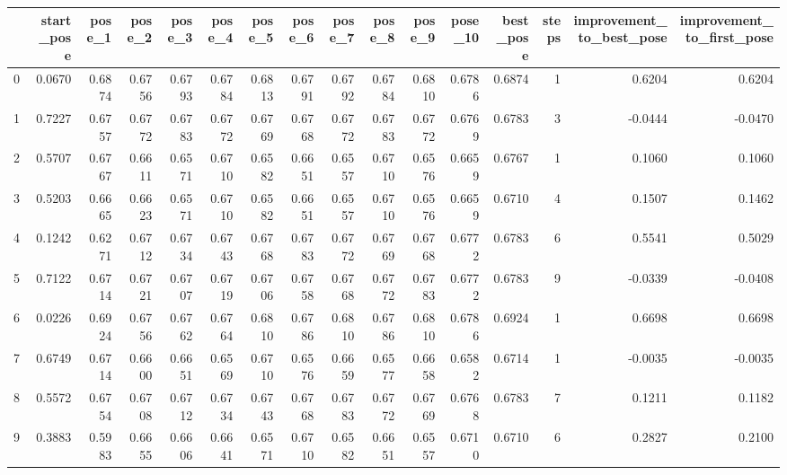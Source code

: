 \begin{tabular}{lrrrrrrrrrrrrrrr}
\toprule
{} &  start\_pose &  pose\_1 &  pose\_2 &  pose\_3 &  pose\_4 &  pose\_5 &  pose\_6 &  pose\_7 &  pose\_8 &  pose\_9 &  pose\_10 &  best\_pose &  steps &  improvement\_to\_best\_pose &  improvement\_to\_first\_pose \\
\midrule
0  &      0.0670 &  0.6874 &  0.6756 &  0.6793 &  0.6784 &  0.6813 &  0.6791 &  0.6792 &  0.6784 &  0.6810 &   0.6786 &     0.6874 &      1 &                    0.6204 &                     0.6204 \\
1  &      0.7227 &  0.6757 &  0.6772 &  0.6783 &  0.6772 &  0.6769 &  0.6768 &  0.6772 &  0.6783 &  0.6772 &   0.6769 &     0.6783 &      3 &                   -0.0444 &                    -0.0470 \\
2  &      0.5707 &  0.6767 &  0.6611 &  0.6571 &  0.6710 &  0.6582 &  0.6651 &  0.6557 &  0.6710 &  0.6576 &   0.6659 &     0.6767 &      1 &                    0.1060 &                     0.1060 \\
3  &      0.5203 &  0.6665 &  0.6623 &  0.6571 &  0.6710 &  0.6582 &  0.6651 &  0.6557 &  0.6710 &  0.6576 &   0.6659 &     0.6710 &      4 &                    0.1507 &                     0.1462 \\
4  &      0.1242 &  0.6271 &  0.6712 &  0.6734 &  0.6743 &  0.6768 &  0.6783 &  0.6772 &  0.6769 &  0.6768 &   0.6772 &     0.6783 &      6 &                    0.5541 &                     0.5029 \\
5  &      0.7122 &  0.6714 &  0.6721 &  0.6707 &  0.6719 &  0.6706 &  0.6758 &  0.6768 &  0.6772 &  0.6783 &   0.6772 &     0.6783 &      9 &                   -0.0339 &                    -0.0408 \\
6  &      0.0226 &  0.6924 &  0.6756 &  0.6762 &  0.6764 &  0.6810 &  0.6786 &  0.6810 &  0.6786 &  0.6810 &   0.6786 &     0.6924 &      1 &                    0.6698 &                     0.6698 \\
7  &      0.6749 &  0.6714 &  0.6600 &  0.6651 &  0.6569 &  0.6710 &  0.6576 &  0.6659 &  0.6577 &  0.6658 &   0.6582 &     0.6714 &      1 &                   -0.0035 &                    -0.0035 \\
8  &      0.5572 &  0.6754 &  0.6708 &  0.6712 &  0.6734 &  0.6743 &  0.6768 &  0.6783 &  0.6772 &  0.6769 &   0.6768 &     0.6783 &      7 &                    0.1211 &                     0.1182 \\
9  &      0.3883 &  0.5983 &  0.6655 &  0.6606 &  0.6641 &  0.6571 &  0.6710 &  0.6582 &  0.6651 &  0.6557 &   0.6710 &     0.6710 &      6 &                    0.2827 &                     0.2100 \\

\end{tabular}
